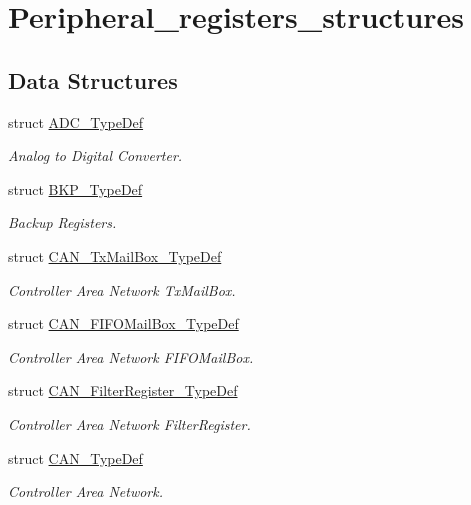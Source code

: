 \hypertarget{group___peripheral__registers__structures}{}\section{Peripheral\+\_\+registers\+\_\+structures}
\label{group___peripheral__registers__structures}
\subsection*{Data Structures}
\begin{DoxyCompactItemize}
\item 
struct \mbox{\hyperlink{struct_a_d_c___type_def}{A\+D\+C\+\_\+\+Type\+Def}}
\begin{DoxyCompactList}\small\item\em Analog to Digital Converter. \end{DoxyCompactList}\item 
struct \mbox{\hyperlink{struct_b_k_p___type_def}{B\+K\+P\+\_\+\+Type\+Def}}
\begin{DoxyCompactList}\small\item\em Backup Registers. \end{DoxyCompactList}\item 
struct \mbox{\hyperlink{struct_c_a_n___tx_mail_box___type_def}{C\+A\+N\+\_\+\+Tx\+Mail\+Box\+\_\+\+Type\+Def}}
\begin{DoxyCompactList}\small\item\em Controller Area Network Tx\+Mail\+Box. \end{DoxyCompactList}\item 
struct \mbox{\hyperlink{struct_c_a_n___f_i_f_o_mail_box___type_def}{C\+A\+N\+\_\+\+F\+I\+F\+O\+Mail\+Box\+\_\+\+Type\+Def}}
\begin{DoxyCompactList}\small\item\em Controller Area Network F\+I\+F\+O\+Mail\+Box. \end{DoxyCompactList}\item 
struct \mbox{\hyperlink{struct_c_a_n___filter_register___type_def}{C\+A\+N\+\_\+\+Filter\+Register\+\_\+\+Type\+Def}}
\begin{DoxyCompactList}\small\item\em Controller Area Network Filter\+Register. \end{DoxyCompactList}\item 
struct \mbox{\hyperlink{struct_c_a_n___type_def}{C\+A\+N\+\_\+\+Type\+Def}}
\begin{DoxyCompactList}\small\item\em Controller Area Network. \end{DoxyCompactList}\item 

\end{DoxyCompactItemize}
